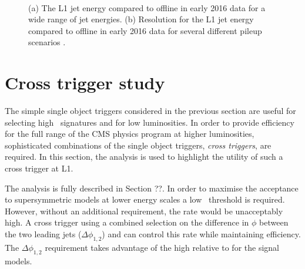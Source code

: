 \begin{figure}
\centering
	~
	\caption{(a) The L1 jet energy compared to offline in early 2016 data for a wide
range of jet energies. (b) Resolution for the L1 jet energy compared to offline in early 2016 data for several different 
pileup scenarios \cite{l1sums_perf}.}
\label{fig:trig_2016}
\end{figure}


\section{Cross trigger study}
\label{sec:cross_trigger}
The simple single object triggers considered in the previous section are useful for selecting
high \pt~signatures and for low luminosities. In order to provide efficiency for
the full range of the CMS physics program at higher luminosities, sophisticated combinations
of the single object triggers, \emph{cross triggers}, are required. In this section, the \alphat 
analysis is used to highlight the utility of such a cross trigger at L1. 

The \alphat analysis is fully described in Section ??. In order to maximise the acceptance
to supersymmetric models at lower energy scales a low \scalht~threshold is required. 
However, without an additional requirement, the rate
would be unacceptably high. A cross trigger using a combined selection on the difference 
in $\phi$ between the two leading jets ($\Delta\phi_{1,2}$) and \scalht can control this rate while 
maintaining efficiency. The $\Delta\phi_{1,2}$ requirement takes advantage of the high relative 
\mht to \scalht for the signal models.

